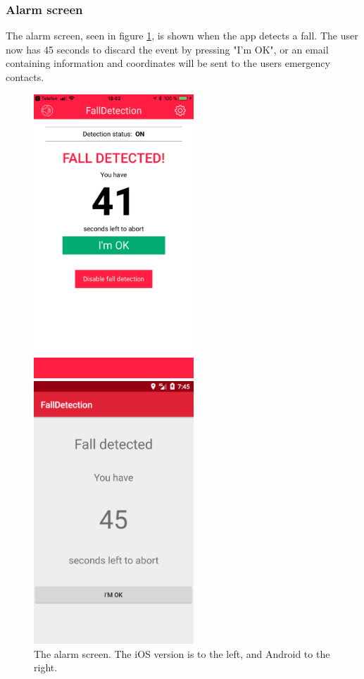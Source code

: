 \documentclass[12pt, a4paper, onecolumn]{article}
\begin{document}
	\newpage
	\subsubsection{Alarm screen}
	
	The alarm screen, seen in figure \ref{fig:alarm-screen}, is shown when the app detects a fall. The user now has 45 seconds to discard the event by pressing "I'm OK", or an email containing information and coordinates will be sent to the users emergency contacts.
	
	\begin{figure}[H]
		\begin{multicols}{2}
			\centering
			\includegraphics[width=6cm]{../img/screenshots/alarm-screen.jpg}\par 
			\includegraphics[width=6cm]{../img/screenshots/alarm-screen-android.png}\par 
		\end{multicols}
		\caption{The alarm screen. The iOS version is to the left, and Android to the right.}%
		\label{fig:alarm-screen}%
	\end{figure}
	
\end{document}
